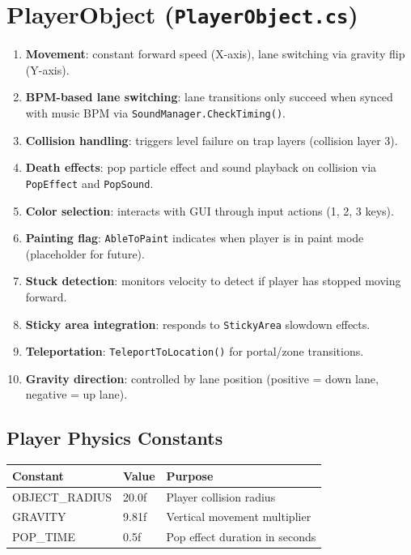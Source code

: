 \documentclass{report}
\begin{document}
\section{PlayerObject (\texttt{PlayerObject.cs})}
\begin{enumerate}[label=\alph*)]
	\item\textbf{Movement}: constant forward speed (X-axis), lane switching via gravity flip (Y-axis).
	\item\textbf{BPM-based lane switching}: lane transitions only succeed when synced with music BPM via \texttt{SoundManager.CheckTiming()}.
	\item\textbf{Collision handling}: triggers level failure on trap layers (collision layer 3).
	\item\textbf{Death effects}: pop particle effect and sound playback on collision via \texttt{PopEffect} and \texttt{PopSound}.
	\item\textbf{Color selection}: interacts with GUI through input actions (1, 2, 3 keys).
	\item\textbf{Painting flag}: \texttt{AbleToPaint} indicates when player is in paint mode (placeholder for future).
	\item\textbf{Stuck detection}: monitors velocity to detect if player has stopped moving forward.
	\item\textbf{Sticky area integration}: responds to \texttt{StickyArea} slowdown effects.
	\item\textbf{Teleportation}: \texttt{TeleportToLocation()} for portal/zone transitions.
	\item\textbf{Gravity direction}: controlled by lane position (positive = down lane, negative = up lane).
\end{enumerate}

\subsection{Player Physics Constants}
\begin{longtable}{|l|l|p{6cm}|}
	\hline
	\textbf{Constant} & \textbf{Value} & \textbf{Purpose}             \\
	\hline
	OBJECT\_RADIUS    & 20.0f          & Player collision radius      \\
	\hline
	GRAVITY           & 9.81f          & Vertical movement multiplier \\
	\hline
	POP\_TIME          & 0.5f           & Pop effect duration in seconds \\
	\hline
\end{longtable}
\end{document}
